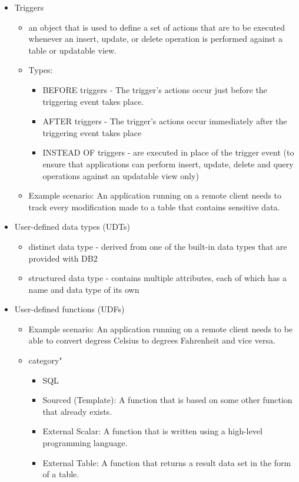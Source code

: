 \documentclass{article}
\begin{document}
\begin{itemize}
\item Triggers
	\begin{itemize}
	\item an object that is used to define a set of actions that are to be executed whenever an insert,
	update, or delete operation is performed against a table or updatable view.
	\item Types:
		\begin{itemize}
		\item BEFORE triggers - The trigger's actions occur just before the triggering event takes place.
		\item AFTER triggers - The trigger's actions occur immediately after the triggering event takes
		place
		\item INSTEAD OF triggers - are executed in place of the trigger event (to ensure that 
		applications can perform insert, update, delete and query operations against an updatable
		view only)
		\end{itemize}
	\item Example scenario: An application running on a remote client needs to track every modification made to a 
	table that contains sensitive data.
	\end{itemize}
\item User-defined data types (UDTs)
	\begin{itemize}
	\item distinct data type - derived from one of the built-in data types that are provided with DB2
	\item {\color{green} structured data type} - contains multiple attributes, each of which has a name
	and data type of its own
	\end{itemize}
\item User-defined functions (UDFs)
	\begin{itemize}
		\item Example scenario: An application running on a remote client needs to be able to convert degress Celsius to degrees
		Fahrenheit and vice versa.
		\item category"
		\begin{itemize}
			\item SQL
			\item Sourced (Template): A function that is based on some other function that already exists.
			\item External Scalar: A function that is written using a high-level programming language.
			\item External Table: A function that returns a result data set in the form of a table.

\end{itemize}
\end{itemize}
\end{itemize}
\end{document}
